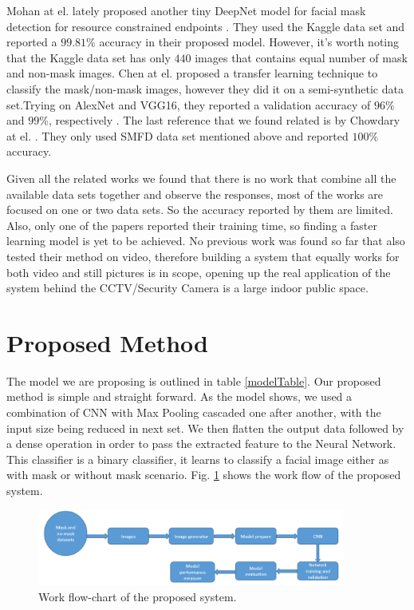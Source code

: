 \documentclass{svproc}
\begin{document}
\par Mohan at el. lately proposed another tiny DeepNet model for facial mask detection for resource constrained endpoints \cite{mohan2020tiny}. They used the Kaggle data set and reported a $99.81\%$ accuracy in their proposed model. However, it's worth noting that the Kaggle data set has only $440$ images that contains equal number of mask and non-mask images. Chen at el. proposed a transfer learning technique to classify the mask/non-mask images, however they did it on a semi-synthetic data set.Trying on AlexNet and VGG16, they reported a validation accuracy of $ 96\%$ and $99\%$, respectively \cite{chen2020efficient}. The last reference that we found related is by Chowdary at el. \cite{chowdary2020face}. They only used SMFD data set mentioned above and reported $100\%$ accuracy. \\

\par Given all the  related works we found that there is no work that combine all the available data sets together and observe the responses, most of the works are focused on one or two data sets. So the accuracy reported by them are limited. Also, only one of the papers reported their training time, so finding a faster learning model is yet to be achieved. No previous work was found so far that also tested their method on video, therefore building a system that equally works for both video and still pictures is in scope, opening up the real application of the system behind the CCTV/Security Camera is a large indoor public space. 

\section{Proposed Method}

The model we are proposing is outlined in table \ref{modelTable}. Our proposed method is simple and straight forward. As the model shows, we used a combination of CNN with Max Pooling cascaded one after another, with the input size being reduced in next set. We then flatten the output data followed by a dense operation in order to pass the extracted feature to the Neural Network. This classifier is a binary classifier, it learns to classify a facial image either as with mask or without mask scenario. Fig. \ref{flowChart} shows the work flow of the proposed system.

\begin{figure}[!ht]
\includegraphics[width=0.9\textwidth]{flowChart.png}
\centering
\caption{Work flow-chart of the proposed system.}
\label{flowChart}
\end{figure}
\end{document}
